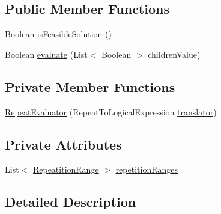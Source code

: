 \subsection*{Public Member Functions}
\begin{DoxyCompactItemize}
\item 
Boolean \hyperlink{classit_1_1emarolab_1_1cagg_1_1core_1_1language_1_1syntax_1_1expressionTree_1_1expressionNodeTyp785488d13bbbabc8bec5d8852bfc23de_af52b895c15c2abec4d2cbcda581c5234}{is\-Feasible\-Solution} ()
\item 
Boolean \hyperlink{classit_1_1emarolab_1_1cagg_1_1core_1_1language_1_1syntax_1_1expressionTree_1_1expressionNodeTyp785488d13bbbabc8bec5d8852bfc23de_a0b8424950d12b2f0778cde0bc05cc5ef}{evaluate} (List$<$ Boolean $>$ children\-Value)
\end{DoxyCompactItemize}
\subsection*{Private Member Functions}
\begin{DoxyCompactItemize}
\item 
\hyperlink{classit_1_1emarolab_1_1cagg_1_1core_1_1language_1_1syntax_1_1expressionTree_1_1expressionNodeTyp785488d13bbbabc8bec5d8852bfc23de_a5c53ba054b27890e0f3ed083ca1f3a5a}{Repeat\-Evaluator} (Repeat\-To\-Logical\-Expression \hyperlink{classit_1_1emarolab_1_1cagg_1_1core_1_1language_1_1syntax_1_1expressionTree_1_1expressionNodeType_1_1RepeatExpressionNode_ab5fb4e475bd09b572d920458ba2dc7a8}{translator})
\end{DoxyCompactItemize}
\subsection*{Private Attributes}
\begin{DoxyCompactItemize}
\item 
List$<$ \hyperlink{classit_1_1emarolab_1_1cagg_1_1core_1_1language_1_1syntax_1_1expressionTree_1_1expressionNodeTyp7498902e136f0103368e78415adbf7d0}{Repeatition\-Range} $>$ \hyperlink{classit_1_1emarolab_1_1cagg_1_1core_1_1language_1_1syntax_1_1expressionTree_1_1expressionNodeTyp785488d13bbbabc8bec5d8852bfc23de_a909c6ec17b8c003cdd09f607527cea0b}{repetition\-Ranges}
\end{DoxyCompactItemize}


\subsection{Detailed Description}


